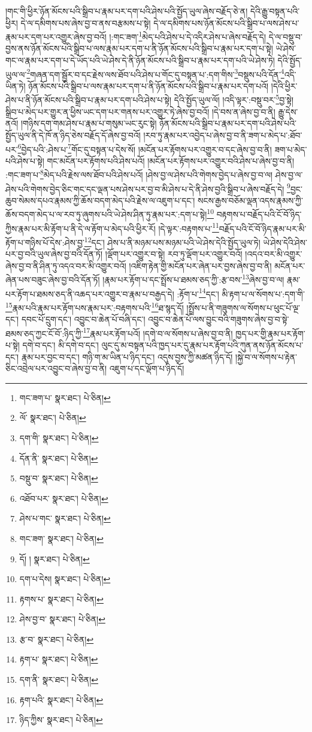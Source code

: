 །གང་གི་ཕྱིར་ཉོན་མོངས་པའི་སྒྲིབ་པ་རྣམ་པར་དག་པའི་ཤེས་པའི་སྤྱོད་ཡུལ་ཞེས་བརྗོད་ཅེ་ན། དེའི་རྒྱུ་བསྟན་པའི་ཕྱིར། དེ་ལ་དམིགས་པས་ཞེས་བྱ་བ་ནས་བརྩམས་པ་སྟེ། དེ་ལ་དམིགས་པས་ཉོན་མོངས་པའི་སྒྲིབ་པ་ལས་ཤེས་པ་རྣམ་པར་དག་པར་འགྱུར་ཞེས་བྱ་བའོ། །:གང་ཟག་\footnote{གང་ཟག་པ་  སྣར་ཐང་།  པེ་ཅིན། }མེད་པའི་ཤེས་པ་དེ་འདིར་ཤེས་པ་ཞེས་བརྗོད་དེ། དེ་ལ་བསྡུ་བ་བྱས་ནས་ཉོན་མོངས་པའི་སྒྲིབ་པ་ལས་རྣམ་པར་དག་པ་ནི་ཉོན་མོངས་པའི་སྒྲིབ་པ་རྣམ་པར་དག་པ་སྟེ། ཡེ་ཤེས་གང་ལ་རྣམ་པར་དག་པ་དེ་ཡོད་པའི་ཡེ་ཤེས་དེ་ནི་ཉོན་མོངས་པའི་སྒྲིབ་པ་རྣམ་པར་དག་པའི་ཡེ་ཤེས་ཏེ། དེའི་སྤྱོད་ཡུལ་ལ་\footnote{ལོ་  སྣར་ཐང་།  པེ་ཅིན། }གཞན་དག་སྦྱོར་བ་དང་རྗེས་ལས་ཐོབ་པའི་ཤེས་པ་གོང་དུ་བསྟན་པ་:དག་གིས་\footnote{དག་གི་  སྣར་ཐང་།  པེ་ཅིན། }བསྡུས་པའི་དོན་\footnote{དོན་ནི་  སྣར་ཐང་།  པེ་ཅིན། }འདི་ཡིན་ཏེ། ཉོན་མོངས་པའི་སྒྲིབ་པ་ལས་རྣམ་པར་དག་པ་ནི་ཉོན་མོངས་པའི་སྒྲིབ་པ་རྣམ་པར་དག་པའོ། །དེའི་ཕྱིར་ཤེས་པ་ནི་ཉོན་མོངས་པའི་སྒྲིབ་པ་རྣམ་པར་དག་པའི་ཤེས་པ་སྟེ། དེའི་སྤྱོད་ཡུལ་ལོ། །འདི་ལྟར་:བསྡུ་བར་\footnote{བསྡུ་བ་  སྣར་ཐང་།  པེ་ཅིན། }བྱ་སྟེ། སྒྲིབ་པ་མེད་པར་གྱུར་ན་ཕྱིས་ཡང་དག་པར་གནས་པར་འགྱུར་ཏེ་ཞེས་བྱ་བའོ། །དེ་བས་ན་ཞེས་བྱ་བ་ནི། རྒྱུ་དེས་ནའོ། །གཉིས་དག་གམ་ཤེས་པ་རྣམ་པ་གསུམ་ཡང་རུང་སྟེ། ཉོན་མོངས་པའི་སྒྲིབ་པ་རྣམ་པར་དག་པའི་ཤེས་པའི་སྤྱོད་ཡུལ་ནི་དེ་ཁོ་ན་ཉིད་ཅེས་བརྗོད་དོ་ཞེས་བྱ་བའོ། །རབ་ཏུ་རྣམ་པར་འབྱེད་པ་ཞེས་བྱ་བ་ནི་ཟག་པ་མེད་པ་:ཐོབ་པར་\footnote{འཐོབ་པར་  སྣར་ཐང་།  པེ་ཅིན། }བྱེད་པའི་:ཤེས་པ་\footnote{ཤེས་པ་གང་  སྣར་ཐང་།  པེ་ཅིན། }གོང་དུ་བསྟན་པ་དེས་སོ། །མངོན་པར་རྟོགས་པར་འགྱུར་བ་དང་ཞེས་བྱ་བ་ནི། ཟག་པ་མེད་པའི་ཤེས་པ་སྟེ། གང་མངོན་པར་རྟོགས་པའི་ཤེས་པའོ། །མངོན་པར་རྟོགས་པར་འགྱུར་བའི་ཤེས་པ་ཞེས་བྱ་བ་ནི། :གང་ཟག་པ་\footnote{གང་ཟག་  སྣར་ཐང་།  པེ་ཅིན། }མེད་པའི་རྗེས་ལས་ཐོབ་པའི་ཤེས་པའོ། །ཤེས་བྱ་ལ་ཤེས་པའི་གེགས་བྱེད་པ་ཞེས་བྱ་བ་ལ། ཤེས་བྱ་ལ་ཤེས་པའི་གེགས་བྱེད་ཅིང་གང་དང་ལྡན་པས་ཤེས་པར་བྱ་བ་མི་ཤེས་པ་དེ་ནི་ཤེས་བྱའི་སྒྲིབ་པ་ཞེས་བརྗོད་དེ། \footnote{དོ། །   སྣར་ཐང་།  པེ་ཅིན། }བྱང་ཆུབ་སེམས་དཔའ་རྣམས་ཀྱི་ཆོས་བདག་མེད་པའི་རྗེས་ལ་འཇུག་པ་དང་། སངས་རྒྱས་བཅོམ་ལྡན་འདས་རྣམས་ཀྱི་ཆོས་བདག་མེད་པ་ལ་རབ་ཏུ་ཞུགས་པའི་ཡེ་ཤེས་ཤིན་ཏུ་རྣམ་པར་:དག་པ་སྟེ།\footnote{དག་པ་དེས།  སྣར་ཐང་།  པེ་ཅིན། } བརྟགས་པ་བརྗོད་པའི་ངོ་བོ་ཉིད་ཀྱིས་རྣམ་པར་མི་རྟོག་པ་ནི་དེ་ལ་རྟོག་པ་མེད་པའི་ཕྱིར་རོ། །དེ་ལྟར་:བརྟགས་པ་\footnote{རྟགས་པ་  སྣར་ཐང་།  པེ་ཅིན། }བརྗོད་པའི་ངོ་བོ་ཉིད་རྣམ་པར་མི་རྟོག་པ་གཉིས་པོ་དེས་:ཤེས་བྱ་\footnote{ཤེས་བྱ་བ་  སྣར་ཐང་།  པེ་ཅིན། }དང་། ཤེས་པ་ནི་མཉམ་པས་མཉམ་པའི་ཡེ་ཤེས་དེའི་སྤྱོད་ཡུལ་ཏེ། ཡེ་ཤེས་དེའི་ཤེས་པར་བྱ་བའི་ཡུལ་ཞེས་བྱ་བའི་དོན་ཏོ། །ལྡོག་པར་འགྱུར་བ་སྟེ། རབ་ཏུ་ལྡོག་པར་འགྱུར་བའོ། །འདའ་བར་མི་འགྱུར་ཞེས་བྱ་བ་ནི་ཤིན་ཏུ་འདའ་བར་མི་འགྱུར་བའོ། །འཇིག་རྟེན་གྱི་མངོན་པར་ཞེན་པར་བྱས་ཞེས་བྱ་བ་ནི། མངོན་པར་ཞེན་པས་བཟུང་ཞེས་བྱ་བའི་དོན་ཏོ། །རྣམ་པར་རྟོག་པ་དང་སྤྲོས་པ་ཐམས་ཅད་ཀྱི་:རྩ་བས་\footnote{རྩ་བ་  སྣར་ཐང་།  པེ་ཅིན། }ཞེས་བྱ་བ་ལ། རྣམ་པར་རྟོག་པ་ཐམས་ཅད་ནི་འཆད་པར་འགྱུར་བ་རྣམ་པ་བརྒྱད་དེ། :རྟོག་པ་\footnote{རྟག་པ་  སྣར་ཐང་།  པེ་ཅིན། }དང་། མི་རྟག་པ་ལ་སོགས་པ་:དག་གི་\footnote{དག་ནི་  སྣར་ཐང་།  པེ་ཅིན། }རྣམ་པའི་རྣམ་པར་རྟོག་པས་རྣམ་པར་:བརྟགས་པའི་\footnote{རྟག་པའི་  སྣར་ཐང་།  པེ་ཅིན། }ཐ་སྙད་དོ། །སྤྲོས་པ་ནི་གཟུགས་ལ་སོགས་པ་ཕུང་པོ་ལྔ་དང་། དབང་པོ་དྲུག་དང་། འབྱུང་བ་ཆེན་པོ་བཞི་དང་། འབྱུང་བ་ཆེན་པོ་ལས་བྱུང་བའི་གཟུགས་ཞེས་བྱ་བ་སྟེ་ཐམས་ཅད་ཀྱང་ངོ་བོ་:ཉིད་ཀྱི་\footnote{ཉིད་ཀྱིས་  སྣར་ཐང་།  པེ་ཅིན། }རྣམ་པར་རྟོག་པའོ། །དགེ་བ་ལ་སོགས་པ་ཞེས་བྱ་བ་ནི། ཁྱད་པར་གྱི་རྣམ་པར་རྟོག་པ་སྟེ། དགེ་བ་དང་། མི་དགེ་བ་དང་། ལུང་དུ་མ་བསྟན་པའི་ཁྱད་པར་དུ་རྣམ་པར་རྟོག་པའི་ཀུན་ནས་ཉོན་མོངས་པ་དང་། རྣམ་པར་བྱང་བ་དང་། གཉི་ག་མ་ཡིན་པ་ཉིད་དང་། འདུས་བྱས་ཀྱི་མཚན་ཉིད་དོ། །སྐྱེ་བ་ལ་སོགས་པ་རྟེན་ཅིང་འབྲེལ་པར་འབྱུང་བ་ཞེས་བྱ་བ་ནི། འཇུག་པ་དང་ལྡོག་པ་ཉིད་དོ། 